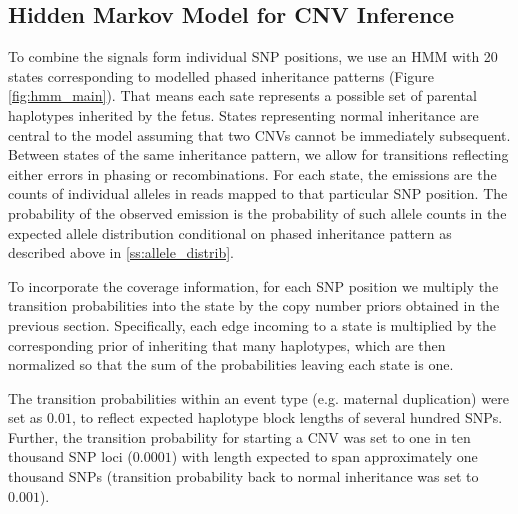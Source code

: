 \subsection{Hidden Markov Model for CNV Inference}\label{ss:hmm}
To combine the signals form individual SNP positions, we use an HMM with 20 states corresponding to modelled phased inheritance patterns (Figure \ref{fig:hmm_main}). That means each sate represents a possible set of parental haplotypes inherited by the fetus. States representing normal inheritance are central to the model assuming that two CNVs cannot be immediately subsequent. Between states of the same inheritance pattern, we allow for transitions reflecting either errors in phasing or recombinations. For each state, the emissions are the counts of individual alleles in reads mapped to that particular SNP position. The probability of the observed emission is the probability of such allele counts in the expected allele distribution conditional on phased inheritance pattern as described above in \ref{ss:allele_distrib}.

To incorporate the coverage information, for each SNP position we multiply the transition probabilities into the state by the copy number priors obtained in the previous section. Specifically, each edge incoming to a state is multiplied by the corresponding prior of inheriting that many haplotypes, which are then normalized so that the sum of the probabilities leaving each state is one. %

The transition probabilities within an event type (e.g. maternal duplication) were set as $0.01$, to reflect expected haplotype block lengths of several hundred SNPs. Further, the transition probability for starting a CNV was set to one in ten thousand SNP loci ($0.0001$) with length expected to span approximately one thousand SNPs (transition probability back to normal inheritance was set to $0.001$).

